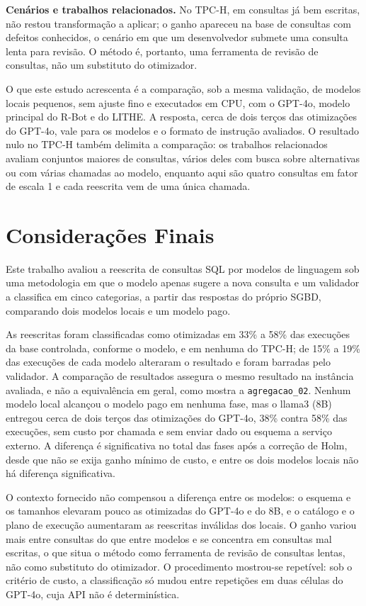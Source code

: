 \documentclass[12pt]{article}
\begin{document}
\textbf{Cenários e trabalhos relacionados.} No TPC-H, em consultas já bem escritas, não restou transformação a aplicar; o ganho apareceu na base de consultas com defeitos conhecidos, o cenário em que um desenvolvedor submete uma consulta lenta para revisão. O método é, portanto, uma ferramenta de revisão de consultas, não um substituto do otimizador.

O que este estudo acrescenta é a comparação, sob a mesma validação, de modelos locais pequenos, sem ajuste fino e executados em CPU, com o GPT-4o, modelo principal do R-Bot e do LITHE. A resposta, cerca de dois terços das otimizações do GPT-4o, vale para os modelos e o formato de instrução avaliados. O resultado nulo no TPC-H também delimita a comparação: os trabalhos relacionados avaliam conjuntos maiores de consultas, vários deles com busca sobre alternativas ou com várias chamadas ao modelo, enquanto aqui são quatro consultas em fator de escala 1 e cada reescrita vem de uma única chamada.

\section{Considerações Finais}

Este trabalho avaliou a reescrita de consultas SQL por modelos de linguagem sob uma metodologia em que o modelo apenas sugere a nova consulta e um validador a classifica em cinco categorias, a partir das respostas do próprio SGBD, comparando dois modelos locais e um modelo pago.

As reescritas foram classificadas como otimizadas em 33\% a 58\% das execuções da base controlada, conforme o modelo, e em nenhuma do TPC-H; de 15\% a 19\% das execuções de cada modelo alteraram o resultado e foram barradas pelo validador. A comparação de resultados assegura o mesmo resultado na instância avaliada, e não a equivalência em geral, como mostra a \texttt{agregacao\_02}. Nenhum modelo local alcançou o modelo pago em nenhuma fase, mas o llama3 (8B) entregou cerca de dois terços das otimizações do GPT-4o, 38\% contra 58\% das execuções, sem custo por chamada e sem enviar dado ou esquema a serviço externo. A diferença é significativa no total das fases após a correção de Holm, desde que não se exija ganho mínimo de custo, e entre os dois modelos locais não há diferença significativa.

O contexto fornecido não compensou a diferença entre os modelos: o esquema e os tamanhos elevaram pouco as otimizadas do GPT-4o e do 8B, e o catálogo e o plano de execução aumentaram as reescritas inválidas dos locais. O ganho variou mais entre consultas do que entre modelos e se concentra em consultas mal escritas, o que situa o método como ferramenta de revisão de consultas lentas, não como substituto do otimizador. O procedimento mostrou-se repetível: sob o critério de custo, a classificação só mudou entre repetições em duas células do GPT-4o, cuja API não é determinística.
\end{document}
